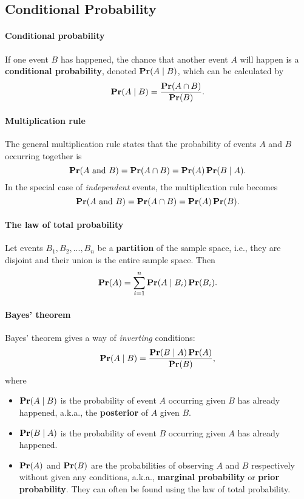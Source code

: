 \subsection{Conditional Probability}

\paragraph{Conditional probability}
If one event $B$ has happened, the chance that another event $A$ will happen is a \textbf{conditional probability}, denoted $\mathop{\mathbf{Pr}}(A \mid B)$, which can be calculated by
$$
    \mathop{\mathbf{Pr}}(A \mid B) = \dfrac{\mathop{\mathbf{Pr}}(A \cap B)}{\mathop{\mathbf{Pr}}(B)}.
$$

\paragraph{Multiplication rule}
The general multiplication rule states that the probability of events $A$ and $B$ occurring together is
$$
    \mathop{\mathbf{Pr}}(\text{$A$ and $B$})
    = \mathop{\mathbf{Pr}}(A \cap B)
    = \mathop{\mathbf{Pr}}(A) \mathop{\mathbf{Pr}}(B \mid A).
$$
In the special case of \textit{independent} events, the multiplication rule becomes
$$
    \mathop{\mathbf{Pr}}(\text{$A$ and $B$})
    = \mathop{\mathbf{Pr}}(A \cap B)
    = \mathop{\mathbf{Pr}}(A) \mathop{\mathbf{Pr}}(B).
$$

\paragraph{The law of total probability}
Let events $B_1, B_2, ..., B_n$ be a \textbf{partition} of the sample space, i.e., they are disjoint and their union is the entire sample space. Then
$$
    \mathop{\mathbf{Pr}}(A) = \sum_{i=1}^{n} \mathop{\mathbf{Pr}}(A \mid B_i) \mathop{\mathbf{Pr}}(B_i).
$$

\paragraph{Bayes' theorem}
Bayes' theorem gives a way of \textit{inverting} conditions:
$$
    \mathop{\mathbf{Pr}}(A \mid B)
    = \dfrac{\mathop{\mathbf{Pr}}(B \mid A) \mathop{\mathbf{Pr}}(A)}{\mathop{\mathbf{Pr}}(B)},
$$
where
\begin{itemize}[style=nextline, itemsep=0cm]
\item $\mathop{\mathbf{Pr}}(A \mid B)$ is the probability of event $A$ occurring given $B$ has already happened, a.k.a., the \textbf{posterior} of $A$ given $B$.
\item $\mathop{\mathbf{Pr}}(B \mid A)$ is the probability of event $B$ occurring given $A$ has already happened.
\item $\mathop{\mathbf{Pr}}(A)$ and $\mathop{\mathbf{Pr}}(B)$ are the probabilities of observing $A$ and $B$ respectively without given any conditions, a.k.a., \textbf{marginal probability} or \textbf{prior probability}. They can often be found using the law of total probability.
\end{itemize}

